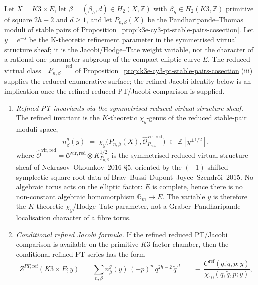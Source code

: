 \begin{proposition}
\label{prop:k3e-cy3-refined-pt-cstar-oberdieck}
Let $X = K3 \times E$, let $\beta = (\beta_h, d) \in H_2(X, \mathbb Z)$ with $\beta_h \in H_2(K3, \mathbb Z)$ primitive of square $2h - 2$ and $d \geq 1$, and let $P_{n, \beta}(X)$ be the Pandharipande--Thomas moduli of stable pairs of Proposition~\ref{prop:k3e-cy3-pt-stable-pairs-cosection}. Let $y = e^{-s}$ be the K-theoretic refinement parameter in the symmetrised virtual structure sheaf; it is the Jacobi/Hodge--Tate weight variable, not the character of a rational one-parameter subgroup of the compact elliptic curve $E$. The reduced virtual class $[P_{n, \beta}]^{\mathrm{red}}$ of Proposition~\ref{prop:k3e-cy3-pt-stable-pairs-cosection}(iii) supplies the reduced enumerative surface; the refined Jacobi identity below is an implication once the refined reduced PT/Jacobi comparison is supplied.
\begin{enumerate}[label=\textup{(\roman*)},leftmargin=1.5em]
\item \emph{Refined PT invariants via the symmetrised reduced virtual
structure sheaf.} The refined invariant is the \(K\)-theoretic
\(\chi_y\)-genus of the reduced stable-pair moduli space,
\[
 n^{g}_{\beta}(y)
 \;=\;
 \chi_y\!\bigl(P_{n,\beta}(X),
 \widehat{\mathcal O}^{\mathrm{vir},\mathrm{red}}_{P_{n,\beta}}\bigr)
 \;\in\; \mathbb Z[y^{\pm 1/2}],
\]
where
\(\widehat{\mathcal O}^{\mathrm{vir},\mathrm{red}}
=\mathcal O^{\mathrm{vir},\mathrm{red}}\otimes K_{P_{n,\beta}}^{1/2}\)
is the symmetrised reduced virtual structure sheaf of
Nekrasov--Okounkov~$2016$ \S$5$, oriented by the
\((-1)\)-shifted symplectic square-root data of
Brav--Bussi--Dupont--Joyce--Szendr\H oi~$2015$. No algebraic torus
acts on the elliptic factor: \(E\) is complete, hence there is no
non-constant algebraic homomorphism \(\mathbb G_m\to E\). The variable
\(y\) is therefore the \(K\)-theoretic \(\chi_y\)/Hodge--Tate
parameter, not a Graber--Pandharipande localisation character of a
fibre torus.
\item \emph{Conditional refined Jacobi formula.} If the refined reduced
PT/Jacobi comparison is available on the primitive \(K3\)-factor chamber,
then the conditional refined PT series has the form
\[
 Z^{PT, \mathrm{ref}}(K3 \times E; y) \;=\; \sum_{n, \beta} n^{g}_{\beta}(y)\, (-p)^{n}\, q^{2h - 2}\, \tilde q^{\,d} \;=\; -\,\frac{C^{\mathrm{ref}}(q, \tilde q, p; y)}{\chi_{10}(q, \tilde q, p; y)},
\]
\end{enumerate}
\end{proposition}
